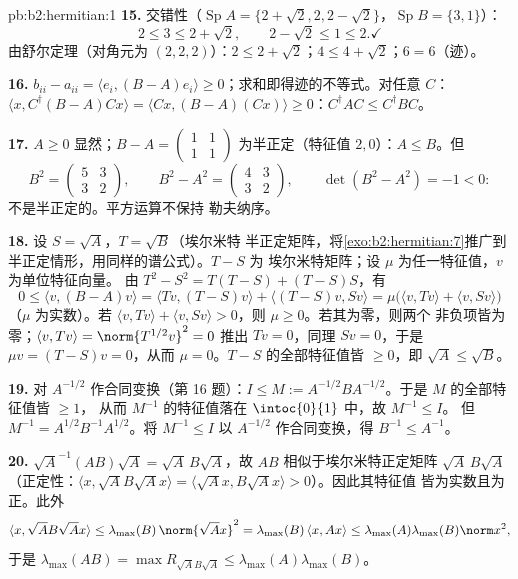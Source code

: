 \begin{solution}{pb:b2:hermitian:1}
\textbf{15.} 交错性（$\operatorname{Sp}A = \{2+\sqrt2, 2,
2-\sqrt2\}$，$\operatorname{Sp}B = \{3, 1\}$）：
\[
2 \leq 3 \leq 2 + \sqrt2,
\qquad
2 - \sqrt2 \leq 1 \leq 2 . \checkmark
\]
由舒尔定理（对角元为 $(2,2,2)$）：$2 \leq 2+\sqrt2$；$4 \leq 4 +
\sqrt2$；$6 = 6$（迹）。\checkmark

\textbf{16.} $b_{ii} - a_{ii} = \langle e_i, (B-A)e_i\rangle
\geq 0$；求和即得迹的不等式。对任意 $C$：$\langle x,
C^\dagger(B - A)Cx\rangle = \langle Cx, (B-A)(Cx)\rangle \geq
0$：$C^\dagger AC \leq C^\dagger BC$。

\textbf{17.} $A \geq 0$ 显然；$B - A = \begin{pmatrix} 1 & 1\\
1 & 1\end{pmatrix}$ 为半正定（特征值 $2,
0$）：$A \leq B$。但
\[
B^2 = \begin{pmatrix} 5 & 3\\ 3 & 2\end{pmatrix},
\qquad
B^2 - A^2 = \begin{pmatrix} 4 & 3\\ 3 & 2\end{pmatrix},
\qquad \det(B^2 - A^2) = -1 < 0 :
\]
不是半正定的。平方运算不保持
勒夫纳序。

\textbf{18.} 设 $S = \sqrt A$，$T = \sqrt B$（埃尔米特
半正定矩阵，将\cref{exo:b2:hermitian:7}推广到
半正定情形，用同样的谱公式）。$T - S$ 为
埃尔米特矩阵；设 $\mu$ 为任一特征值，$v$ 为单位特征向量。
由 $T^2 - S^2 = T(T - S) + (T - S)S$，有
\[
0 \leq \langle v, (B - A)v\rangle
= \langle Tv, (T-S)v\rangle + \langle (T-S)v, Sv\rangle
= \mu\bigl(\langle v, Tv\rangle + \langle v,
Sv\rangle\bigr)
\]
（$\mu$ 为实数）。若 $\langle v, Tv\rangle + \langle v,
Sv\rangle > 0$，则 $\mu \geq 0$。若其为零，则两个
非负项皆为零；$\langle v, Tv\rangle =
\norm{T^{1/2}v}^2 = 0$ 推出 $Tv = 0$，同理 $Sv = 0$，于是
$\mu v = (T - S)v = 0$，从而 $\mu = 0$。$T -
S$ 的全部特征值皆 $\geq 0$，即 $\sqrt A \leq \sqrt B$。

\textbf{19.} 对 $A^{-1/2}$ 作合同变换（第 16 题）：$I \leq M
:= A^{-1/2}BA^{-1/2}$。于是 $M$ 的全部特征值皆 $\geq 1$，
从而 $M^{-1}$ 的特征值落在 $\intoc{0}{1}$ 中，故 $M^{-1} \leq I$。
但 $M^{-1} = A^{1/2}B^{-1}A^{1/2}$。将 $M^{-1} \leq
I$ 以 $A^{-1/2}$ 作合同变换，得 $B^{-1} \leq A^{-1}$。

\textbf{20.} $\sqrt A^{-1}(AB)\sqrt A = \sqrt A\,B\sqrt A$，故
$AB$ 相似于埃尔米特正定矩阵 $\sqrt
A\,B\sqrt A$（正定性：$\langle x, \sqrt AB\sqrt Ax\rangle =
\langle \sqrt Ax, B\sqrt Ax\rangle > 0$）。因此其特征值
皆为实数且为正。此外
\[
\langle x, \sqrt AB\sqrt Ax\rangle
\leq \lambda_{\max}(B)\,\norm{\sqrt Ax}^2
= \lambda_{\max}(B)\,\langle x, Ax\rangle
\leq \lambda_{\max}(A)\lambda_{\max}(B)\norm x^2 ,
\]
于是 $\lambda_{\max}(AB) = \max R_{\sqrt AB\sqrt A} \leq
\lambda_{\max}(A)\lambda_{\max}(B)$。


\end{solution}
